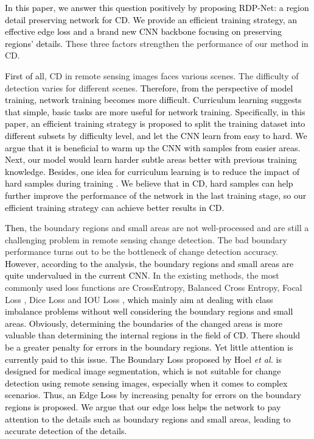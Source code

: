 \documentclass[lettersize,journal]{IEEEtran}
\newcommand{\edita}[1]{\textcolor{black}{#1}}
\newcommand{\editb}[1]{\textcolor{black}{#1}}
\newcommand{\editc}[1]{\textcolor{black}{#1}}
\begin{document}
\edita{In this paper, we answer this question positively by proposing RDP-Net: a region detail preserving network for CD.
We provide an efficient training strategy, an effective edge loss and a brand new CNN backbone focusing on preserving regions’ details.}
These three factors strengthen the performance of our method in CD.

\edita{First of all}, CD in remote sensing images faces various scenes.
The difficulty of detection varies for different scenes.
\editc{Therefore, }
\edita{from the perspective of model training, network training becomes more difficult.}
\editb{Curriculum learning\cite{bengio2009curriculum} suggests that simple, basic tasks are more useful for network training.
Specifically, in this paper, an efficient training strategy is proposed to split the training dataset into different subsets by difficulty level, and let the CNN learn from easy to hard.
We argue that it is beneficial to warm up the CNN with samples from easier areas.
Next, our model would learn harder subtle areas better with previous training knowledge.}
\edita{Besides, one idea for curriculum learning is to reduce the impact of hard samples during training \cite{xu-etal-2020-curriculum,jiang2014easy}.
We believe that in CD, hard samples can help further improve the performance of the network in the last training stage, so our efficient training strategy can achieve better results in CD.}


\edita{Then}, the boundary regions and small areas are not well-processed and are still a challenging problem in remote sensing change detection.
The bad boundary performance turns out to be the bottleneck of change detection accuracy.
\edita{However, according to the analysis, the boundary regions and small areas are quite undervalued in the current CNN.}
In the existing methods, the most commonly used loss functions are CrossEntropy, Balanced Cross Entropy, Focal Loss \cite{lin2017focal}, Dice Loss \cite{milletari2016v} and IOU Loss \cite{yu2016unitbox}, \edita{which mainly aim at dealing with class imbalance problems without well considering the boundary regions and small areas.
Obviously, determining the boundaries of the changed areas is more valuable than determining the internal regions in the field of CD.
There should be a greater penalty for errors in the boundary regions.
Yet little attention is currently paid to this issue.
The Boundary Loss proposed by Hoel \textit{et al.} \cite{kervadec2019boundary} is designed for medical image segmentation, which is not suitable for change detection using remote sensing images, especially when it comes to complex scenarios.}
\edita{Thus, an Edge Loss by increasing penalty for errors on the boundary regions is proposed.
We argue that our edge loss helps the network to pay attention to the details such as boundary regions and small areas, leading to accurate detection of the details.}
\end{document}
